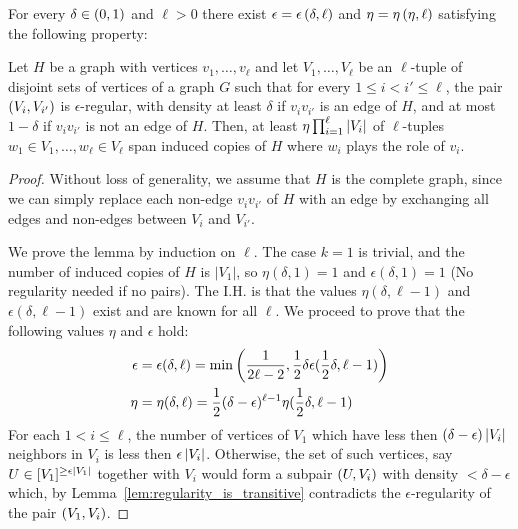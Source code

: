     \begin{lemma} \label{lem:H_like_partition_implies_H_abundance}
        For every $\delta \in \left( 0, 1 \right)$ and $\ell > 0$ there exist $\epsilon = \epsilon \left( \delta, \ell \right)$ and
        $\eta = \eta \left( \eta, \ell \right)$ satisfying the following property:

        Let $H$ be a graph with vertices $v_1, \dots,v_\ell$ and let $V_1, \dots, V_\ell$ be an $\ell$-tuple of disjoint
        sets of vertices of a graph $G$ such that for every $1 \leq i < i' \leq \ell$, the pair $\left( V_i, V_{i'} \right)$
        is $\epsilon$-regular, with density at least $\delta$ if $v_i v_{i'}$ is an edge of $H$, and at most $1 - \delta$
        if $v_i v_{i'}$ is not an edge of $H$.
        Then, at least $\eta \prod_{i=1}^\ell \left| V_i \right|$ of $\ell$-tuples $w_1 \in V_1, \dots, w_\ell \in V_\ell$
        span induced copies of $H$ where $w_i$ plays the role of $v_i$.
        \begin{proof}
            Without loss of generality, we assume that $H$ is the complete graph, since we can simply replace each non-edge
            $v_i v_{i'}$ of $H$ with an edge by exchanging all edges and non-edges between $V_i$ and $V_{i'}$.

            We prove the lemma by induction on $\ell$.
            The case $k=1$ is trivial, and the number of induced copies of $H$ is $|V_1|$, so $\eta(\delta, 1) = 1$ and
            $\epsilon(\delta, 1) = 1$ (No regularity needed if no pairs).
            The I.H. is that the values $\eta(\delta, \ell-1)$ and $\epsilon(\delta, \ell-1)$ exist and are known for all
            $\ell$.
            We proceed to prove that the following values $\eta$ and $\epsilon$ hold:
            \begin{align*}
                \epsilon &= \epsilon(\delta, \ell)
                    = \min \left( \frac{1}{2\ell - 2}, \frac{1}{2} \delta \epsilon(\frac{1}{2}\delta, \ell-1) \right) \\
                \eta &= \eta(\delta, \ell)
                    = \frac{1}{2} (\delta - \epsilon)^{\ell-1} \eta(\frac{1}{2}\delta, \ell-1)
            \end{align*}
            For each $1 < i \leq \ell$, the number of vertices of $V_1$ which have less then
            $(\delta - \epsilon) \left| V_i \right|$ neighbors in $V_i$ is less then $\epsilon \left| V_i \right|$.
            Otherwise, the set of such vertices, say $U \in [V_1]^{\geq \epsilon \left| V_1 \right|}$ together with $V_i$
            would form a subpair $\left( U, V_i \right)$ with density $< \delta - \epsilon$ which, by
            Lemma~\ref{lem:regularity_is_transitive} contradicts the $\epsilon$-regularity of the pair $\left( V_1, V_i \right)$.


\end{proof}
\end{lemma}
